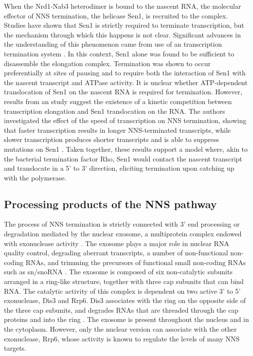 When the Nrd1-Nab3 heterodimer is bound to the nascent RNA, the molecular effector of NNS termination, the helicase Sen1, is recruited to the complex. 
Studies have shown that Sen1 is strictly required to terminate transcription, but the mechanism through which this happens is not clear. 
Significant advances in the understanding of this phenomenon came from use of an \invitro{} transcription termination system \cite{porrua:2013:bacteriallike}. 
In this context, Sen1 alone was found to be sufficient to disassemble the elongation complex. Termination was shown to occur preferentially at sites of pausing and to require both the interaction of Sen1 with the nascent transcript and ATPase activity. 
It is unclear whether ATP-dependent translocation of Sen1 on the nascent RNA is required for termination. However, results from an \invivo{} study suggest the existence of a kinetic competition between transcription elongation and Sen1 translocation on the RNA. 
The authors investigated the effect of the speed of transcription on NNS termination, showing that faster transcription results in longer NNS-terminated transcripts, while slower transcription produces shorter transcripts and is able to suppress mutations on Sen1 \cite{hazelbaker:2013:kinetic}. 
Taken together, these results support a model where, akin to the bacterial termination factor Rho, Sen1 would contact the nascent transcript and translocate in a 5’ to 3’ direction, eliciting termination upon catching up with the polymerase.

\subsection{Processing products of the NNS pathway}

The process of NNS termination is strictly connected with 3' end processing or degradation mediated by the nuclear exosome, a multiprotein complex endowed with exonuclease activity \cite{vasiljeva:2006:nrd1}. 
The exosome plays a major role in nuclear RNA quality control, degrading aberrant transcripts, a number of non-functional non-coding RNAs, and trimming the precursors of functional small non-coding RNAs such as sn/snoRNA \cite[for review see][]{kilchert:2016:regulation}. 
The exosome is composed of six non-catalytic subunits arranged in a ring-like structure, together with three cap subunits that can bind RNA. 
The catalytic activity of this complex is dependent on two active 3' to 5' exonuclease, Dis3 and Rrp6. 
Dis3 associates with the ring on the opposite side of the three cap subunits, and degrades RNAs that are threaded through the cap proteins and into the ring \cite{makino:2015:rna}. 
The exosome is present throughout the nucleus and in the cytoplasm. 
However, only the nuclear version can associate with the other exonuclease, Rrp6, whose activity is known to regulate the levels of many NNS targets.

